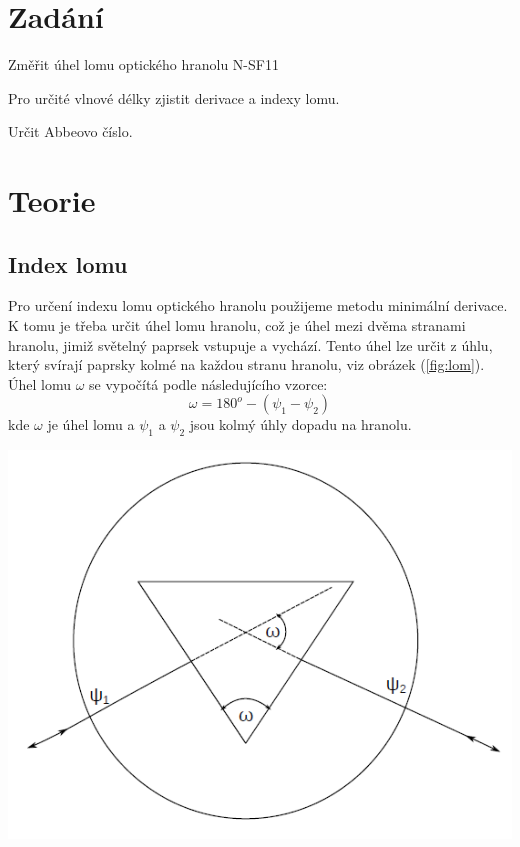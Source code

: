 \documentclass[a4paper,11pt]{article}
\begin{document}
\vskip1cm
    \begin{minipage}[t]{0.5\textwidth} 
    \section{Zadání}
        Změřit úhel lomu optického hranolu N-SF11
        \par Pro určité vlnové délky zjistit derivace a indexy lomu. 
        \par Určit Abbeovo číslo.
    \section{Teorie}
        \subsection{Index lomu}
            Pro určení indexu lomu optického hranolu použijeme metodu minimální derivace. K tomu je třeba určit úhel lomu hranolu, což je úhel mezi dvěma stranami hranolu, jimiž světelný paprsek vstupuje a vychází. Tento úhel lze určit z úhlu, který svírají paprsky kolmé na každou stranu hranolu, viz obrázek (\ref{fig:lom}). Úhel lomu $\omega$ se vypočítá podle následujícího vzorce:
            \begin{equation}
                \omega = 180^o - (\psi_1 - \psi_2)
            \end{equation}
            kde $\omega$ je úhel lomu a $\psi_1$ a $\psi_2$ jsou kolmý úhly dopadu na hranolu.
            \vspace{10pt}
            \par 
            \centering
            \includegraphics[scale=0.4]{lom}
            \captionsetup{justification=centering, font=footnotesize}
            \label{fig:lom}
            \vspace{10pt}
            \raggedright
    \end{minipage}
\end{document}
